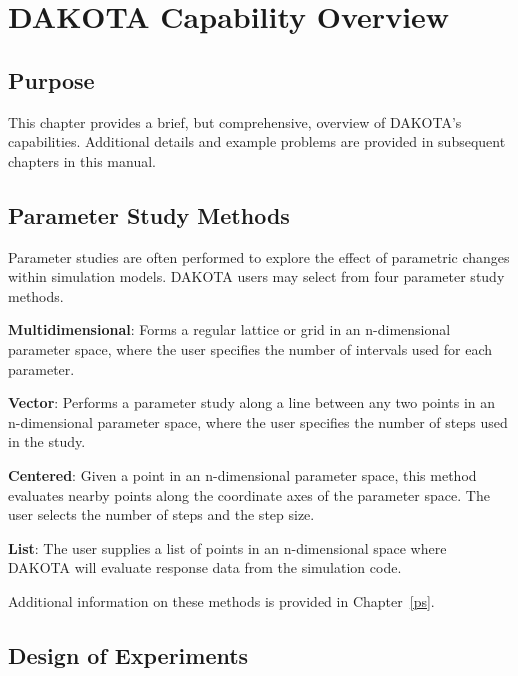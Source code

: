 \chapter{DAKOTA Capability Overview}\label{capabilities}

\section{Purpose}\label{capabilities:purpose}

This chapter provides a brief, but comprehensive, overview of DAKOTA's
capabilities. Additional details and example problems are provided in
subsequent chapters in this manual.

\section{Parameter Study Methods}\label{capabilities:parameter}

Parameter studies are often performed to explore the effect of
parametric changes within simulation models. DAKOTA users may select
from four parameter study methods.

\textbf{Multidimensional}: Forms a regular lattice or grid in an
n-dimensional parameter space, where the user specifies the number of
intervals used for each parameter.

\textbf{Vector}: Performs a parameter study along a line between any two
points in an n-dimensional parameter space, where the user specifies
the number of steps used in the study.

\textbf{Centered}: Given a point in an n-dimensional parameter space,
this method evaluates nearby points along the coordinate axes of the
parameter space. The user selects the number of steps and the step
size.

\textbf{List}: The user supplies a list of points in an n-dimensional
space where DAKOTA will evaluate response data from the simulation
code.

Additional information on these methods is provided in Chapter~\ref{ps}.

\section{Design of Experiments}\label{capabilities:sampling}

